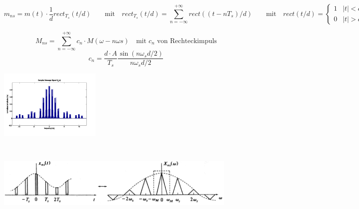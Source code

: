 	\begin{minipage}{18cm}
		\begin{equation*}
			m_{ns} = m(t)\cdot\frac{1}{d}rect_{T_s}(t/d) \qquad \text{mit} \quad rect_{T_s}(t/d) = \sum_{n=-\infty}^{+\infty}rect((t-nT_s)/d)\qquad \text{mit} \quad rect(t/d) = \begin{cases}
				1 & |t| < d/2\\
				0 & |t| > d/2
			\end{cases}
		\end{equation*}
	\end{minipage}
	
	\begin{minipage}{12cm}
		\begin{equation*}
			M_{ns} = \sum_{n=-\infty}^{+\infty}c_n \cdot M(\omega-n\omega s) \quad \text{mit $c_n$ von Rechteckimpuls}
		\end{equation*}
		\begin{equation*}
			c_n = \frac{d\cdot A}{T_s}\frac{\sin(n\omega_s d/2)}{n \omega_s d/2}
		\end{equation*}
	\end{minipage}
	\begin{minipage}{5cm}
			\includegraphics[width=5cm]{bilder/dig_naturalsampling_spektrum}
	\end{minipage}\\
	\begin{center}
		\begin{minipage}{12cm}
				\includegraphics[width=12cm]{bilder/dig_naturalsampling.png}
			\end{minipage}
	\end{center}
\newpage

